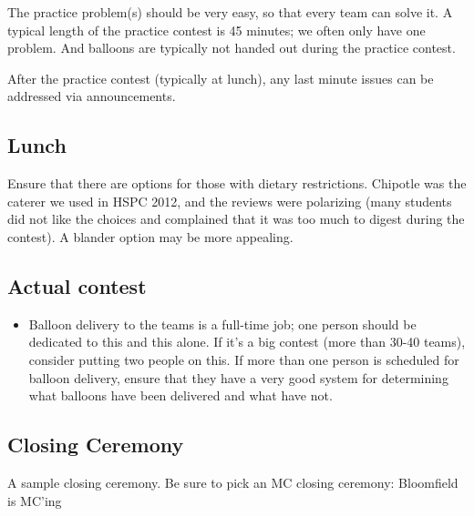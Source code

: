\documentclass[11pt,twoside,letterpaper]{book}
\newenvironment{itemlist}{
\begin{itemize}
\setlength{\itemsep}{0pt}
\setlength{\parskip}{0pt}}
{\end{itemize}}
\begin{document}
The practice problem(s) should be very easy, so that every team can
solve it.  A typical length of the practice contest is 45 minutes; we
often only have one problem.  And balloons are typically not handed
out during the practice contest.

After the practice contest (typically at lunch), any last minute
issues can be addressed via announcements.

\subsection{Lunch}

Ensure that there are options for those with dietary restrictions. Chipotle
was the caterer we used in HSPC 2012, and the reviews were polarizing (many
students did not like the choices and complained that it was too much to digest
during the contest). A blander option may be more appealing.

\subsection{Actual contest}

\begin{itemlist}
\item Balloon delivery to the teams is a full-time job; one person
should be dedicated to this and this alone.  If it's a big contest
(more than 30-40 teams), consider putting two people on this. If more 
than one person is scheduled for balloon delivery, ensure that they 
have a very good system for determining what balloons have been delivered 
and what have not.
\end{itemlist}

\subsection{Closing Ceremony}

A sample closing ceremony.  Be sure to pick an MC 
closing ceremony: Bloomfield is MC'ing
\end{document}
